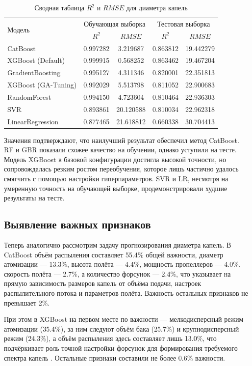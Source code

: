 \begin{table}[htbp!]
	\centering\small
	\caption{Сводная таблица $R^2$ и $RMSE$ для диаметра капель}
	\label{tab:droplet-size-table}		
	\begin{tabular}{|l|c|c|c|c|}
		\hline
		\multirow{2}{*}{Модель} & \multicolumn{2}{c|}{Обучающая выборка} & \multicolumn{2}{c|}{Тестовая выборка}\\\cline{2-5} 
		& $R^2$ & $RMSE$ & $R^2$ & $RMSE$\\\hline
		CatBoost&0.997282&3.219687&0.863812&19.442279\\
		XGBoost (Default)&0.999915&0.568252&0.863462&19.467204\\
		GradientBoosting&0.995127&4.311346&0.820001&22.351813\\
		XGBoost (GA-Tuning)&0.992029&5.513798&0.811052&22.900683\\
		RandomForest&0.994150&4.723604&0.810464&22.936303\\
		SVR&0.893861&20.120588&0.810034&22.962318\\
		LinearRegression&0.877465&21.618812&0.660338&30.704413\\
		\hline
	\end{tabular}	
	\normalsize
\end{table}

Значения подтверждают, что наилучший результат обеспечил метод CatBoost. RF и GBR показали схожее качество на обучении, однако уступили на тесте. Модель XGBoost в базовой конфигурации достигла высокой точности, но сопровождалась резким ростом переобучения, которое лишь частично удалось смягчить с помощью настройки гиперпараметров. SVR и LR, несмотря на умеренную точность на обучающей выборке, продемонстрировали худшие результаты на тесте.

\subsection{Выявление важных признаков}

Теперь аналогично рассмотрим задачу прогнозирования диаметра капель. В CatBoost объём распыления составляет 55.4\% общей важности, диаметр атомизации --- 13.3\%, высота полёта --- 4.4\%, мощность пропеллеров --- 4.0\%, скорость полёта --- 2.7\%, а количество форсунок --- 2.4\%, что указывает на прямую зависимость размеров капель от объёма подачи, настроек распылительного потока и параметров полёта. Важность остальных признаков не превышает 2\%. 

При этом в XGBoost на первом месте по важности --- мелкодисперсный режим атомизации (35.4\%), за ним следуют объём бака (25.7\%) и крупнодисперсный режим (24.3\%), а объём распыления здесь составляет лишь 13.0\%, что подчёркивает роль точной настройки форсунок для формирования требуемого спектра капель \cite{Liu2025, Vitoria2022}. Остальные признаки составили не более 0.6\% важности.

